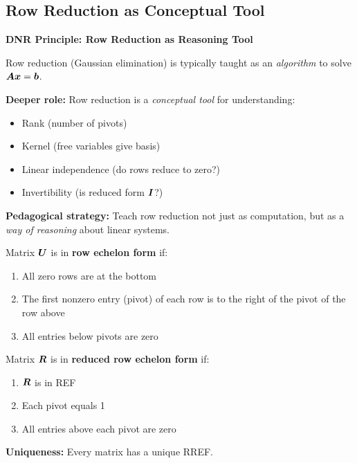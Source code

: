 \subsection{Row Reduction as Conceptual Tool}

\begin{dualitybox}
    \textbf{DNR Principle: Row Reduction as Reasoning Tool}

    Row reduction (Gaussian elimination) is typically taught as an
    \textit{algorithm} to solve $\bm{A}\bm{x} = \bm{b}$.

    \textbf{Deeper role:} Row reduction is a \textit{conceptual tool} for understanding:
    \begin{itemize}
        \item Rank (number of pivots)
        \item Kernel (free variables give basis)
        \item Linear independence (do rows reduce to zero?)
        \item Invertibility (is reduced form $\bm{I}$?)
    \end{itemize}

    \textbf{Pedagogical strategy:} Teach row reduction not just as computation, but as a \textit{way of reasoning} about linear systems.
\end{dualitybox}

\begin{definition}
    Matrix $\bm{U}$ is in \textbf{row echelon form} if:
    \begin{enumerate}
        \item All zero rows are at the bottom
        \item The first nonzero entry (pivot) of each row is to the right of the pivot of the
              row above
        \item All entries below pivots are zero
    \end{enumerate}
\end{definition}

\begin{definition}
    Matrix $\bm{R}$ is in \textbf{reduced row echelon form} if:
    \begin{enumerate}
        \item $\bm{R}$ is in REF
        \item Each pivot equals 1
        \item All entries above each pivot are zero
    \end{enumerate}

    \textbf{Uniqueness:} Every matrix has a unique RREF.
\end{definition}


